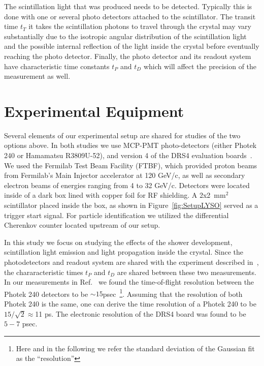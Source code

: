 \documentclass[12pt]{article}
\begin{document}
The scintillation light that was produced needs to be detected. Typically this is done
with one or several photo detectors attached to the scintillator. The
transit time $t_T$
it takes the scintillation photons to travel through the crystal may vary
substantially due to the isotropic angular distribution of the scintillation
light and the possible internal reflection of the light inside the crystal
before eventually reaching the photo detector. Finally, the photo detector and
its readout system have characteristic time constants $t_P$ and $t_D$ which will
affect the precision of the measurement as well.


\section{Experimental Equipment}

Several elements of our experimental setup are shared for studies of the two
options above. In both studies we use MCP-PMT photo-detectors (either Photek 240
or Hamamatsu R3809U-52), and version 4 of the DRS4 evaluation
boards~\cite{DRS4}. We used the Fermilab Test Beam Facility (FTBF), which
provided proton beams from Fermilab's Main Injector accelerator at 120 GeV/c, as
well as secondary electron beams of energies ranging from 4 to 32 GeV/c.
Detectors were located inside of a dark box lined with copper foil for RF
shielding. A 2x2~mm$^2$ scintillator placed inside the box, as shown in
Figure~\ref{fig:SetupLYSO} served as a trigger start signal. For particle
identification we utilized the differential Cherenkov counter located upstream
of our setup.


In this study we focus on studying the effects of the shower development,
scintillation light emission and light propagation inside the crystal. Since the
photodetectors and readout system are shared with the experiment described
in~\cite{MCPFastCaloNIMA}, the chararacteristic times $t_P$ and $t_D$ are shared
between these two measurements. In our measurements in
Ref.~\cite{MCPFastCaloNIMA} we found the time-of-flight resolution between the
Photek 240 detectors to be $\sim 15$psec~\footnote{Here and in the following we
refer the standard deviation of the Gaussian fit as the ``resolution''}.
Assuming that the resolution of both Photek 240 is the same, one can derive the
time resolution of a Photek 240 to be $15/\sqrt{2}\approx$11 ps. The electronic
resolution of the DRS4 board was found to be $5-7$ psec. 
\end{document}
